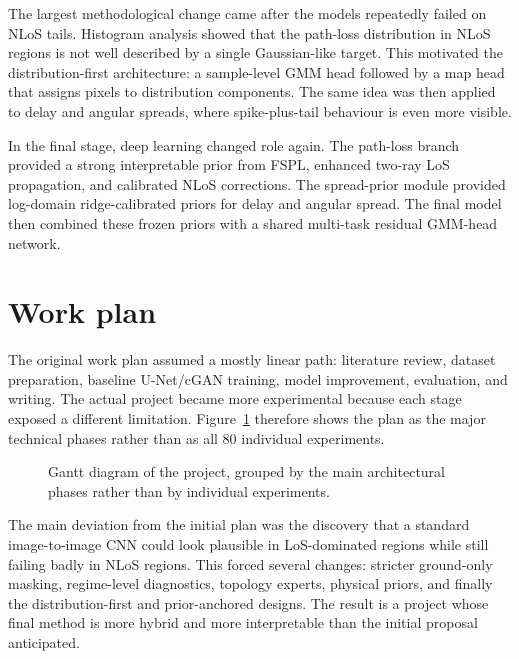 The largest methodological change came after the models repeatedly failed on
NLoS tails. Histogram analysis showed that the path-loss distribution in NLoS
regions is not well described by a single Gaussian-like target. This motivated
the distribution-first architecture: a sample-level GMM head followed
by a map head that assigns pixels to distribution components. The same idea was
then applied to delay and angular spreads, where spike-plus-tail behaviour is
even more visible.

In the final stage, deep learning changed role again. The path-loss branch
provided a strong interpretable prior from FSPL, enhanced two-ray LoS
propagation, and calibrated NLoS corrections. The spread-prior module provided
log-domain ridge-calibrated priors for delay and angular spread. The final model
then combined these frozen priors with a shared multi-task residual GMM-head
network.

\section{Work plan}
\label{sec:workplan}

The original work plan assumed a mostly linear path: literature review, dataset
preparation, baseline U-Net/cGAN training, model improvement, evaluation, and
writing. The actual project became more experimental because each stage exposed
a different limitation. Figure~\ref{fig:gantt} therefore shows the plan as the
major technical phases rather than as all 80 individual experiments.

\begin{figure}[ht]
  \centering
  
  \caption[Project's Gantt diagram]{Gantt diagram of the project, grouped by
  the main architectural phases rather than by individual experiments.}
  \label{fig:gantt}
\end{figure}

The main deviation from the initial plan was the discovery that a standard
image-to-image CNN could look plausible in LoS-dominated regions while still
failing badly in NLoS regions. This forced several changes: stricter ground-only
masking, regime-level diagnostics, topology experts, physical priors, and
finally the distribution-first and prior-anchored designs. The result is a
project whose final method is more hybrid and more interpretable than the
initial proposal anticipated.
